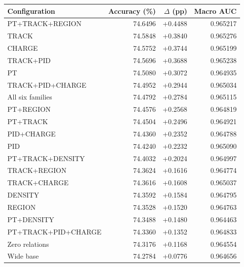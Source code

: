 \begin{table}[htbp]
\centering
\small
\setlength{\tabcolsep}{4pt}
\begin{tabularx}{\linewidth}{@{}Xrrr@{}}
\toprule
Configuration & Accuracy (\%) & $\Delta$ (pp) & Macro AUC \\
\midrule
PT+TRACK+REGION & 74.6496 & +0.4488 & 0.965217 \\ %
TRACK & 74.5848 & +0.3840 & 0.965276 \\ %
CHARGE & 74.5752 & +0.3744 & 0.965199 \\ %
TRACK+PID & 74.5696 & +0.3688 & 0.965238 \\ %
PT & 74.5080 & +0.3072 & 0.964935 \\ %
TRACK+PID+CHARGE & 74.4952 & +0.2944 & 0.965034 \\ %
All six families & 74.4792 & +0.2784 & 0.965115 \\ %
PT+REGION & 74.4576 & +0.2568 & 0.964819 \\ %
PT+TRACK & 74.4504 & +0.2496 & 0.964921 \\ %
PID+CHARGE & 74.4360 & +0.2352 & 0.964788 \\ %
PID & 74.4240 & +0.2232 & 0.965090 \\ %
PT+TRACK+DENSITY & 74.4032 & +0.2024 & 0.964997 \\ %
TRACK+REGION & 74.3624 & +0.1616 & 0.964774 \\ %
TRACK+CHARGE & 74.3616 & +0.1608 & 0.965037 \\ %
DENSITY & 74.3592 & +0.1584 & 0.964795 \\ %
REGION & 74.3528 & +0.1520 & 0.964763 \\ %
PT+DENSITY & 74.3488 & +0.1480 & 0.964463 \\ %
PT+TRACK+PID+CHARGE & 74.3360 & +0.1352 & 0.964833 \\ %
Zero relations & 74.3176 & +0.1168 & 0.964554 \\ %
Wide base & 74.2784 & +0.0776 & 0.964656 \\ %

\end{tabularx}
\end{table}
